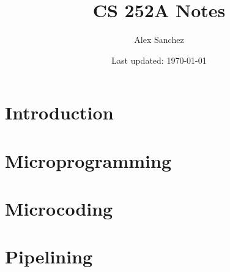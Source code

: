 \documentclass[openany]{book}
\title{CS 252A Notes}
\author{Alex Sanchez}
\date{Last updated: \today}
\begin{document}
\maketitle
\tableofcontents

\chapter{Introduction}


\chapter{Microprogramming}


\chapter{Microcoding}


\chapter{Pipelining}

\end{document}
